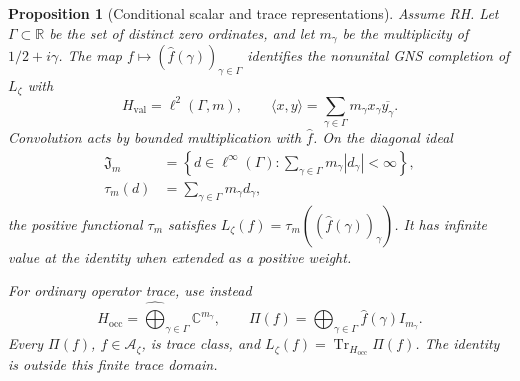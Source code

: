 \documentclass[11pt]{article}
\newtheorem{proposition}[theorem]{Proposition}
\theoremstyle{definition}
\theoremstyle{remark}
\numberwithin{equation}{section}
\newcommand{\cA}{\mathcal A}
\newcommand{\R}{\mathbb R}
\newcommand{\C}{\mathbb C}
\begin{document}
\begin{proposition}[Conditional scalar and trace representations]
\label{prop:weil-conditional-trace}
Assume RH.  Let $\Gamma\subset\R$ be the set of distinct zero ordinates,
and let $m_\gamma$ be the multiplicity of $1/2+i\gamma$.
The map $f\mapsto(\widehat f(\gamma))_{\gamma\in\Gamma}$ identifies
the nonunital GNS completion of $L_\zeta$ with
\[
 H_{\mathrm{val}}=\ell^2(\Gamma,m),\qquad
 \langle x,y\rangle=\sum_{\gamma\in\Gamma}
                       m_\gamma x_\gamma\overline{y_\gamma}.
\]
Convolution acts by bounded multiplication with $\widehat f$.
On the diagonal ideal
\[
 \begin{aligned}
 \mathfrak J_m&=
 \left\{d\in\ell^\infty(\Gamma):
                   \sum_{\gamma\in\Gamma}m_\gamma|d_\gamma|<\infty\right\},\\
 \tau_m(d)&=\sum_{\gamma\in\Gamma}m_\gamma d_\gamma,
 \end{aligned}
\]
the positive functional $\tau_m$ satisfies
$L_\zeta(f)=\tau_m((\widehat f(\gamma))_\gamma)$.
It has infinite value at the identity when extended as a positive weight.

For ordinary operator trace, use instead
\begin{equation}
 H_{\mathrm{occ}}=\widehat{\bigoplus}_{\gamma\in\Gamma}\C^{m_\gamma},
 \qquad
 \Pi(f)=\bigoplus_{\gamma\in\Gamma}
                         \widehat f(\gamma)I_{m_\gamma}.
 \label{eq:weil-multiplicity-trace}
\end{equation}
Every $\Pi(f)$, $f\in\cA_\zeta$, is trace class, and
$L_\zeta(f)=\operatorname{Tr}_{H_{\mathrm{occ}}}\Pi(f)$.
The identity is outside this finite trace domain.
\end{proposition}
\end{document}
